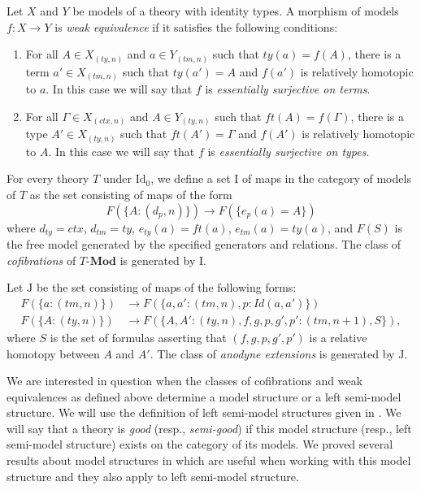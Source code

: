 \documentclass[reqno]{amsart}
\theoremstyle{definition}
\theoremstyle{remark}
\newcommand{\cat}[1]{\mathbf{#1}}
\newcommand{\Mod}[1]{#1\text{-}\cat{Mod}}
\newcommand{\IdT}{\mathrm{Id}}
\newcommand{\Id}{\mathit{Id}}
\newcommand{\I}{\mathrm{I}}
\newcommand{\J}{\mathrm{J}}
\numberwithin{figure}{section}
\begin{document}
Let $X$ and $Y$ be models of a theory with identity types.
A morphism of models $f : X \to Y$ is \emph{weak equivalence} if it satisfies the following conditions:
\begin{enumerate}
\item For all $A \in X_{(ty,n)}$ and $a \in Y_{(tm,n)}$ such that $ty(a) = f(A)$,
there is a term $a' \in X_{(tm,n)}$ such that $ty(a') = A$ and $f(a')$ is relatively homotopic to $a$.
In this case we will say that $f$ is \emph{essentially surjective on terms}.
\item For all $\Gamma \in X_{(ctx,n)}$ and $A \in Y_{(ty,n)}$ such that $ft(A) = f(\Gamma)$,
there is a type $A' \in X_{(ty,n)}$ such that $ft(A') = \Gamma$ and $f(A')$ is relatively homotopic to $A$.
In this case we will say that $f$ is \emph{essentially surjective on types}.
\end{enumerate}

For every theory $T$ under $\IdT_0$, we define a set $\I$ of maps in the category of models of $T$ as the set consisting of maps of the form
\[ F(\{ A : (d_p,n) \}) \to F(\{ e_p(a) = A \}) \]
where $d_{ty} = ctx$, $d_{tm} = ty$, $e_{ty}(a) = ft(a)$, $e_{tm}(a) = ty(a)$,
and $F(S)$ is the free model generated by the specified generators and relations.
The class of \emph{cofibrations} of $\Mod{T}$ is generated by $\I$.

Let $\J$ be the set consisting of maps of the following forms:
\begin{align*}
F(\{ a : (tm,n) \}) & \to F(\{ a, a' : (tm,n), p : \Id(a,a') \}) \\
F(\{ A : (ty,n) \}) & \to F(\{ A, A' : (ty,n), f,g,p,g',p' : (tm,n+1), S \}),
\end{align*}
where $S$ is the set of formulas asserting that $(f,g,p,g',p')$ is a relative homotopy between $A$ and $A'$.
The class of \emph{anodyne extensions} is generated by $\J$.

We are interested in question when the classes of cofibrations and weak equivalences as defined above determine a model structure or a left semi-model structure.
We will use the definition of left semi-model structures given in \cite[Lemma~6.7]{kap-lum-model}.
We will say that a theory is \emph{good} (resp., \emph{semi-good}) if this model structure (resp., left semi-model structure) exists on the category of its models.
We proved several results about model structures in \cite{f-model-structures} which are useful when working with this model structure and they also apply to left semi-model structure.
\end{document}
